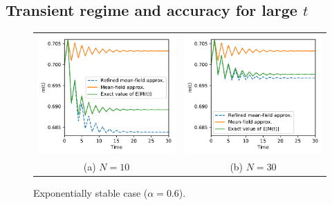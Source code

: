 \documentclass{amsart}
\begin{document}
\subsection{Transient regime and accuracy for large $t$}

\begin{figure}[ht]
  \centering
  \begin{tabular}{@{}c@{}c@{}}
    \includegraphics[width=.5\linewidth]{unstable1D_a60_N10}
    &\includegraphics[width=.5\linewidth]{unstable1D_a60_N30}\\
    (a) $N=10$ & (b) $N=30$
  \end{tabular}
  \caption{Exponentially stable case ($\alpha=0.6$).}
  \label{fig:stable}
\end{figure}
\end{document}
